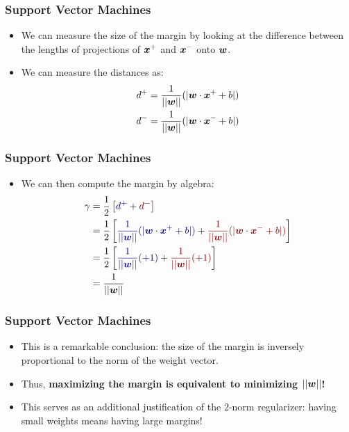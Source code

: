 \documentclass[trans]{beamer}
\begin{document}
\begin{frame}
  \frametitle{Support Vector Machines}
\begin{itemize}
\item We can measure the size of the margin by
looking at the difference between the lengths of projections of
${\boldsymbol{x}}^+$ and ${\boldsymbol{x}}^-$ onto ${\boldsymbol{w}}$.  
\item 
We can measure the distances as:
%
\begin{align}
d^+ &= \frac 1 {\left\vert\left\vert {\boldsymbol{w}} \right\vert\right\vert} (|{\boldsymbol{w}} \cdot {\boldsymbol{x}}^+ + b|) \\
d^- &=  \frac 1 {\left\vert\left\vert {\boldsymbol{w}} \right\vert\right\vert}(|{\boldsymbol{w}} \cdot {\boldsymbol{x}}^- + b|) 
\end{align}
%
\end{itemize}
\end{frame}
\begin{frame}
  \frametitle{Support Vector Machines}
\begin{itemize}
\item We can then compute the margin by algebra:
%
\begin{align}
\ga
&= \frac 1 2 \left[ \textcolor{darkblue}{d^+} 
                  +\textcolor{darkred}{d^-} \right] \\
&= \frac 1 2
   \left[
   \textcolor{darkblue}{\frac 1 {\norm{\vw}} (|\dotp{\vw}{\vx^+} + b|) }
 + \textcolor{darkred}{\frac 1 {\norm{\vw}} (|\dotp{\vw}{\vx^-} +b|) }
   \right]
\\
&= \frac 1 2 \left[
   \textcolor{darkblue}{\frac 1 {\norm{\vw}} (+1) }
 +\textcolor{darkred}{\frac 1 {\norm{\vw}} (+1) }
 \right]
\\
&= \frac 1 {\norm{\vw}}
\end{align}
%
\end{itemize}
\end{frame}
\begin{frame}
  \frametitle{Support Vector Machines}
\begin{itemize}
\item 
This is a remarkable conclusion: the size of the margin is inversely
proportional to the norm of the weight vector.
\item   Thus, {\bf maximizing
  the margin is equivalent to minimizing $\left\vert\left\vert {\boldsymbol{w}} \right\vert\right\vert$!}  
  \item This serves
as an additional justification of the $2$-norm regularizer: having
small weights means having large margins!
\end{itemize}
\end{frame}
\end{document}
